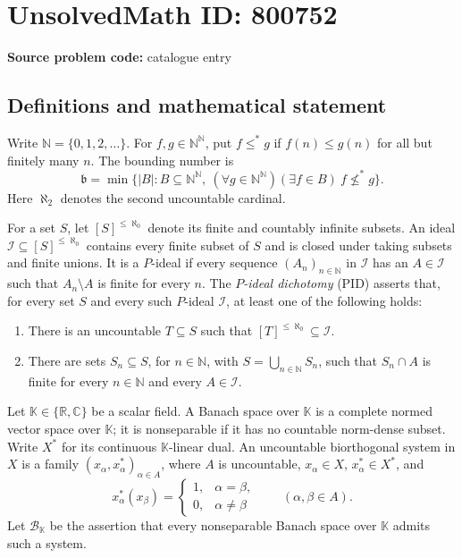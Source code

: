 \documentclass[11pt]{article}
\newcommand{\N}{\mathbb{N}}
\newcommand{\R}{\mathbb{R}}
\newcommand{\C}{\mathbb{C}}
\begin{document}
\section*{UnsolvedMath ID: 800752}
\textbf{Source problem code:} catalogue entry
\subsection{Definitions and mathematical statement}
Write \(\N=\{0,1,2,\ldots\}\). For \(f,g\in\N^{\N}\), put \(f\leq^{*}g\) if \(f(n)\leq g(n)\) for all but finitely many \(n\). The bounding number is
\[
\mathfrak b=\min\bigl\{|B|:B\subseteq\N^{\N},\ (\forall g\in\N^{\N})(\exists f\in B)\ f\not\leq^{*}g\bigr\}.
\]
Here \(\aleph_2\) denotes the second uncountable cardinal.

For a set \(S\), let \([S]^{\leq\aleph_0}\) denote its finite and countably infinite subsets. An ideal \(\mathcal I\subseteq[S]^{\leq\aleph_0}\) contains every finite subset of \(S\) and is closed under taking subsets and finite unions. It is a \(P\)-ideal if every sequence \((A_n)_{n\in\N}\) in \(\mathcal I\) has an \(A\in\mathcal I\) such that \(A_n\setminus A\) is finite for every \(n\). The \emph{\(P\)-ideal dichotomy} (PID) asserts that, for every set \(S\) and every such \(P\)-ideal \(\mathcal I\), at least one of the following holds:
\begin{enumerate}
\item There is an uncountable \(T\subseteq S\) such that \([T]^{\leq\aleph_0}\subseteq\mathcal I\).
\item There are sets \(S_n\subseteq S\), for \(n\in\N\), with \(S=\bigcup_{n\in\N}S_n\), such that \(S_n\cap A\) is finite for every \(n\in\N\) and every \(A\in\mathcal I\).
\end{enumerate}

Let \(\mathbb K\in\{\R,\C\}\) be a scalar field. A Banach space over \(\mathbb K\) is a complete normed vector space over \(\mathbb K\); it is nonseparable if it has no countable norm-dense subset. Write \(X^*\) for its continuous \(\mathbb K\)-linear dual. An uncountable biorthogonal system in \(X\) is a family \((x_\alpha,x_\alpha^*)_{\alpha\in A}\), where \(A\) is uncountable, \(x_\alpha\in X\), \(x_\alpha^*\in X^*\), and
\[
x_\alpha^*(x_\beta)=\begin{cases}1,&\alpha=\beta,\\0,&\alpha\ne\beta\end{cases}
\qquad(\alpha,\beta\in A).
\]
Let \(\mathcal B_{\mathbb K}\) be the assertion that every nonseparable Banach space over \(\mathbb K\) admits such a system.
\end{document}

